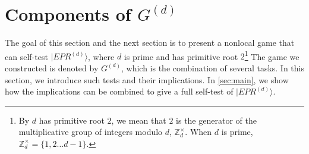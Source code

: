 \documentclass[11pt,letterpaper]{article}
\newcommand{\ket}[1]{|#1\rangle}
\DeclarePairedDelimiter{\set}{\lbrace}{\rbrace}
\DeclarePairedDelimiter{\ip}{\langle}{\rangle}
\newcommand{\Z}{\mathbb{Z}}
\newcommand{\1}{\mathbb{1}}
\newcommand{\J}{\mathcal{J}}
\newcommand{\EPR}[1]{EPR^{(#1)}}
\newcommand{\G}[1]{G^{(#1)}}
\newtheorem{definition}[theorem]{Definition}
\theoremstyle{definition}
\begin{document}
\section{Components of $\G{d}$}
\label{sec:comp}
The goal of this section and the next section is to 
present a nonlocal game that can self-test $\ket{\EPR{d}}$, 
where $d$ is prime and has primitive root $2$\footnote{By $d$ has primitive root $2$,
we mean that $2$ is the generator of the multiplicative group of integers modulo $d$, $\Z_d^\times$.
When $d$ is prime, $\Z_d^\times = \{1,2\dots d-1\}$.}
The game we constructed is denoted by $\G{d}$, which is the combination of several tasks.
In this section, we introduce such tests and their implications.
In \cref{sec:main}, we show how the implications can be combined to give a full self-test of $\ket{\EPR{d}}$. 
\end{document}

